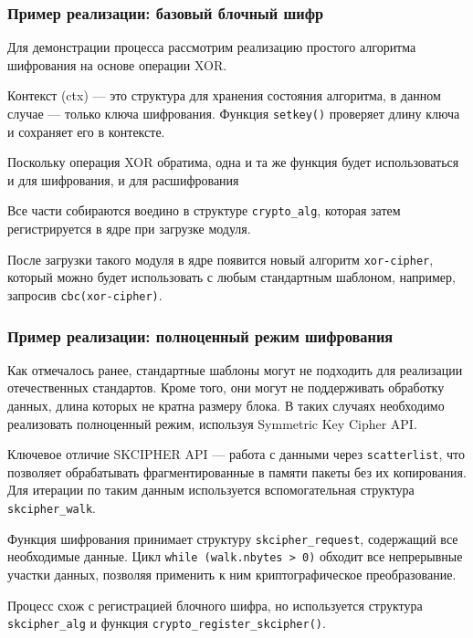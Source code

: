 \subsubsection{Пример реализации: базовый блочный шифр}
Для демонстрации процесса рассмотрим реализацию простого алгоритма шифрования на основе операции XOR.


Контекст (ctx) — это структура для хранения состояния алгоритма, в данном случае — только ключа шифрования.
Функция \texttt{setkey()} проверяет длину ключа и сохраняет его в контексте.



Поскольку операция XOR обратима, одна и та же функция будет использоваться и для шифрования, и для расшифрования



Все части собираются воедино в структуре \texttt{crypto_alg}, которая затем регистрируется в ядре при загрузке модуля.



После загрузки такого модуля в ядре появится новый алгоритм \texttt{xor-cipher}, который можно будет использовать с любым стандартным шаблоном, например, запросив \texttt{cbc(xor-cipher)}.

\subsubsection{Пример реализации: полноценный режим шифрования}

Как отмечалось ранее, стандартные шаблоны могут не подходить для реализации отечественных стандартов.
Кроме того, они могут не поддерживать обработку данных, длина которых не кратна размеру блока.
В таких случаях необходимо реализовать полноценный режим, используя Symmetric Key Cipher API.

Ключевое отличие SKCIPHER API — работа с данными через \texttt{scatterlist}, что позволяет обрабатывать фрагментированные в памяти пакеты без их копирования. Для итерации по таким данным используется вспомогательная структура \texttt{skcipher_walk}.

Функция шифрования принимает структуру \texttt{skcipher_request}, содержащий все необходимые данные.
Цикл \texttt{while (walk.nbytes > 0)} обходит все непрерывные участки данных, позволяя применить к ним криптографическое преобразование.



Процесс схож с регистрацией блочного шифра, но используется структура \texttt{skcipher_alg} и функция \texttt{crypto_register_skcipher()}.

